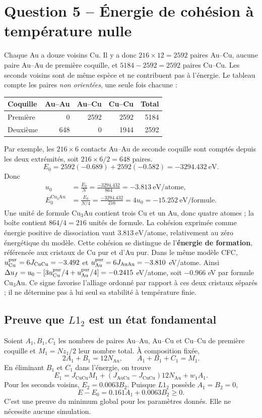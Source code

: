 \documentclass[10pt,a4paper]{article}
\newcommand{\Au}{\mathrm{Au}}
\newcommand{\Cu}{\mathrm{Cu}}
\begin{document}
\section{Question 5 -- Énergie de cohésion à température nulle}
Chaque Au a douze voisins Cu. Il y a donc $216\times12=2592$ paires Au--Cu,
aucune paire Au--Au de première coquille, et $5184-2592=2592$ paires Cu--Cu.
Les seconds voisins sont de même espèce et ne contribuent pas à l'énergie.
Le tableau compte les paires \emph{non orientées}, une seule fois chacune :
\begin{center}\small
\begin{tabular}{lrrrr}\toprule
Coquille & Au--Au & Au--Cu & Cu--Cu & Total\\\midrule
Première & 0 & 2592 & 2592 & 5184\\
Deuxième & 648 & 0 & 1944 & 2592\\\bottomrule
\end{tabular}\end{center}
Par exemple, les $216\times6$ contacts Au--Au de seconde coquille sont
comptés depuis les deux extrémités, soit $216\times6/2=648$ paires.
\[
E_0=2592(-0.689)+2592(-0.582)=-3294.432\ \mathrm{eV}.
\]
Donc
\begin{equation}
\begin{aligned}
u_0&=\frac{E_0}{N}=\frac{-3294.432}{864}
=\boxed{-3.813\ \mathrm{eV/atome}},\\
E_0^{\Cu_3\Au}&=\frac{E_0}{N/4}=\frac{-3294.432}{216}=4u_0
=\boxed{-15.252\ \mathrm{eV/formule}}.
\end{aligned}
\end{equation}
Une unité de formule Cu$_3$Au contient trois Cu et un Au, donc quatre
atomes ; la boîte contient $864/4=216$ unités de formule.
La cohésion exprimée comme énergie positive de dissociation vaut
$3.813\ \mathrm{eV/atome}$, relativement au zéro énergétique du modèle.
Cette cohésion se distingue de l'\textbf{énergie de formation}, référencée
aux cristaux de Cu pur et d'Au pur. Dans le même modèle CFC,
$u_{\Cu}^{\rm pur}=6J_{\Cu\Cu}=-3.492$ et
$u_{\Au}^{\rm pur}=6J_{\Au\Au}=-3.810$ eV/atome. Ainsi
$\Delta u_f=u_0-[3u_{\Cu}^{\rm pur}/4+u_{\Au}^{\rm pur}/4]
=-0.2415$ eV/atome, soit $-0.966$ eV par formule Cu$_3$Au.
Ce signe favorise l'alliage ordonné par rapport à ces deux cristaux
séparés ; il ne détermine pas à lui seul sa stabilité à température finie.

\subsection{Preuve que \texorpdfstring{$L1_2$}{L12} est un état fondamental}
Soient $A_1,B_1,C_1$ les nombres de paires Au--Au, Au--Cu et Cu--Cu de
première coquille et $M_1=Nz_1/2$ leur nombre total. À composition fixée,
\[
2A_1+B_1=12N_{\Au},\qquad A_1+B_1+C_1=M_1.
\]
En éliminant $B_1$ et $C_1$ dans l'énergie, on trouve
\[
E_1=J_{\Cu\Cu}M_1+(J_{\Au\Cu}-J_{\Cu\Cu})12N_{\Au}+w_1A_1.
\]
Pour les seconds voisins, $E_2=0.0063B_2$. Puisque $L1_2$ possède
$A_1=B_2=0$,
\begin{equation}
\boxed{E-E_0=0.161A_1+0.0063B_2\ge0.}
\end{equation}
C'est une preuve du minimum global pour les paramètres donnés. Elle ne
nécessite aucune simulation.
\end{document}
